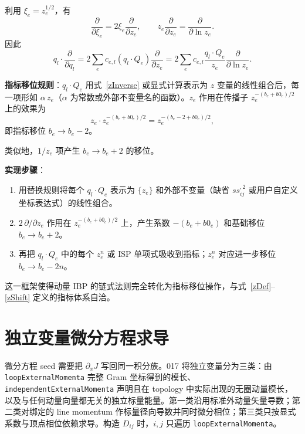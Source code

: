 ﻿\documentclass[a4paper,11pt]{article}
\begin{document}
利用 $\xi_e=z_e^{1/2}$，有
\begin{equation}
 \frac{\partial}{\partial\xi_e}
 =2\xi_e\frac{\partial}{\partial z_e},
 \qquad
 z_e\frac{\partial}{\partial z_e}
 =\frac{\partial}{\partial\ln z_e}.
\end{equation}
因此
\begin{equation}
  q_l \cdot \frac{\partial}{\partial q_l}
  =2\sum_e c_{e,l}(q_l\cdot Q_e)\frac{\partial}{\partial z_e}
  =2\sum_e c_{e,l}\frac{q_l\cdot Q_e}{z_e}
     \frac{\partial}{\partial\ln z_e}.
  \label{chainRuleZ}
\end{equation}

\textbf{指标移位规则}：$q_l \cdot Q_e$ 用式~\eqref{zInverse} 或显式计算表示为 $z$ 变量的线性组合后，每一项形如 $\alpha\, z_e$（$\alpha$ 为常数或外部不变量名的函数）。$z_e$ 作用在传播子 $z_e^{-(b_e+b0_e)/2}$ 上的效果为
\begin{equation}
  z_e \cdot z_e^{-(b_e+b0_e)/2} = z_e^{-(b_e - 2 + b0_e)/2},
  \label{zShift}
\end{equation}
即指标移位 $b_e \to b_e - 2$。

类似地，$1/z_e$ 项产生 $b_e \to b_e + 2$ 的移位。

\textbf{实现步骤}：
\begin{enumerate}
  \item 用替换规则将每个 $q_l \cdot Q_e$ 表示为 $\{z_e\}$ 和外部不变量（缺省 $ss_{ij}^{,2}$ 或用户自定义坐标表达式）的线性组合。
  \item $2\,\partial/\partial z_e$ 作用在 $z_e^{-(b_e+b0_e)/2}$ 上，产生系数 $-(b_e+b0_e)$ 和基础移位 $b_e\to b_e+2$。
  \item 再把 $q_l\cdot Q_e$ 中的每个 $z_e^n$ 或 ISP 单项式吸收到指标；$z_e^n$ 对应进一步移位 $b_e\to b_e-2n$。
\end{enumerate}

这一框架使得动量 IBP 的链式法则完全转化为指标移位操作，与式~\eqref{zDef}--\eqref{zShift} 定义的指标体系自洽。

\section{独立变量微分方程求导}

微分方程 seed 需要把 $\partial_x J$ 写回同一积分族。017 将独立变量分为三类：由 \texttt{loopExternalMomenta} 完整 Gram 坐标得到的模长、\texttt{independentExternalMomenta} 声明且在 topology 中实际出现的无圈动量模长，以及与任何动量向量都无关的独立标量能量。第一类沿用标准外动量矢量导数；第二类对绑定的 line momentum 作标量径向导数并同时微分相位；第三类只按显式系数与顶点相位依赖求导。构造 $D_{ij}$ 时，$i,j$ 只遍历 \texttt{loopExternalMomenta}。
\end{document}
